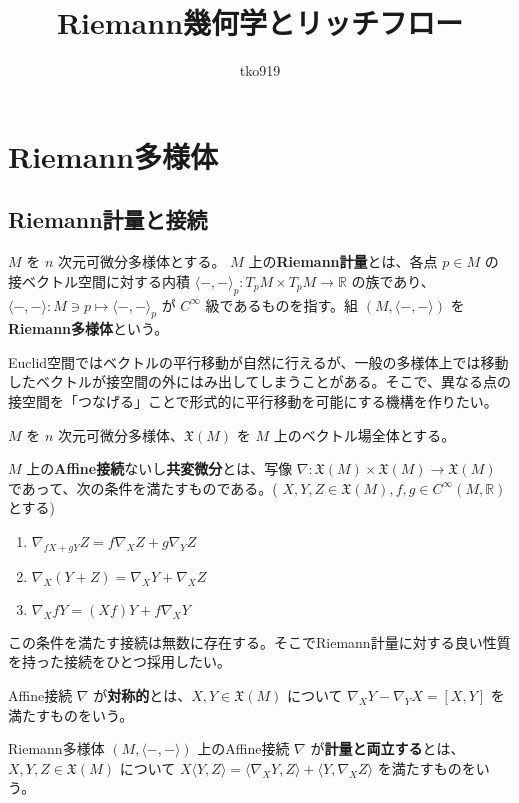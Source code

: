 \documentclass[dvipdfmx,a4paper]{jsreport}
\title{Riemann幾何学とリッチフロー}
\author{tko919}
\date{}
\theoremstyle{definition}
\newcommand{\R}{\mathbb{R}}
\begin{document}
\maketitle
\tableofcontents

\chapter{Riemann多様体}

\section{Riemann計量と接続}
 $M$ を $n$ 次元可微分多様体とする。 $M$ 上の\textbf{Riemann計量}とは、各点 $p \in M$ の接ベクトル空間に対する内積 $\langle -,- \rangle_p \colon T_pM \times T_pM \to \R$ の族であり、$\langle -,- \rangle \colon M \ni p \mapsto \langle -,- \rangle_p$ が $C^\infty$ 級であるものを指す。組 $(M,\langle -,- \rangle)$ を\textbf{Riemann多様体}という。


Euclid空間ではベクトルの平行移動が自然に行えるが、一般の多様体上では移動したベクトルが接空間の外にはみ出してしまうことがある。そこで、異なる点の接空間を「つなげる」ことで形式的に平行移動を可能にする機構を作りたい。

 $M$ を $n$ 次元可微分多様体、$\mathfrak{X}(M)$ を $M$ 上のベクトル場全体とする。

$M$ 上の\textbf{Affine接続}ないし\textbf{共変微分}とは、写像 $\nabla:\mathfrak{X}(M) \times \mathfrak{X}(M) \to \mathfrak{X}(M)$ であって、次の条件を満たすものである。( $X,Y,Z \in \mathfrak{X}(M), f,g \in C^\infty(M,\R)$ とする)

\begin{enumerate}
    \item $\nabla_{fX+gY}Z=f\nabla_XZ+g\nabla_Y Z$
    \item $\nabla_{X}(Y+Z)=\nabla_XY+\nabla_X Z$ 
    \item $\nabla_{X}fY=(Xf)Y+f\nabla_X Y$
\end{enumerate}

この条件を満たす接続は無数に存在する。そこでRiemann計量に対する良い性質を持った接続をひとつ採用したい。

 Affine接続 $\nabla$ が\textbf{対称的}とは、$X,Y \in \mathfrak{X}(M)$ について $\nabla_XY-\nabla_YX=[X,Y]$ を満たすものをいう。

 Riemann多様体 $(M,\langle -,- \rangle)$ 上のAffine接続 $\nabla$ が\textbf{計量と両立する}とは、$X,Y,Z \in \mathfrak{X}(M)$ について $X \langle Y,Z \rangle=\langle \nabla_X Y,Z \rangle+\langle Y,\nabla_X Z \rangle$ を満たすものをいう。
\end{document}
